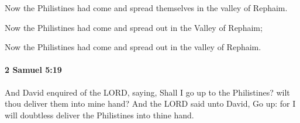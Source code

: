 			\begin{versebox}
					\item[BHS] 
					\item[ASV] Now the Philistines had come and spread themselves in the valley of Rephaim.
					\item[NIV] Now the Philistines had come and spread out in the Valley of Rephaim;
					\item[NRSV] Now the Philistines had come and spread out in the valley of Rephaim.
			\end{versebox}

		\paragraph{2 Samuel 5:19} %
			\label{2SAMUEL-5-19}

			And David enquired of the LORD, saying, Shall I go up to the Philistines? wilt thou deliver them into mine hand? And the LORD said unto David, Go up: for I will doubtless deliver the Philistines into thine hand.

